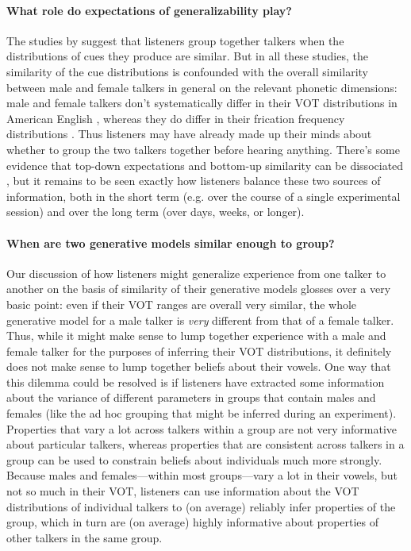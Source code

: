 \paragraph{What role do expectations of generalizability play?}
\label{sec:what-role-expect}

The studies by \textcite{Kraljic2005,Kraljic2006,Kraljic2007} suggest that listeners group together talkers when the distributions of cues they produce are similar.  But in all these studies, the similarity of the cue distributions is confounded with the overall similarity between male and female talkers in general on the relevant phonetic dimensions: male and female talkers don't systematically differ in their VOT distributions in American English \autocite{Allen2003}, whereas they do differ in their frication frequency distributions \autocite{Newman2001}.  Thus listeners may have already made up their minds about whether to group the two talkers together before hearing anything.  There's some evidence that top-down expectations and bottom-up similarity can be dissociated \autocite{Munson2011,Reinisch2014}, but it remains to be seen exactly how listeners balance these two sources of information, both in the short term (e.g. over the course of a single experimental session) and over the long term (over days, weeks, or longer).
\label{r1-reinisch2}

\paragraph{When are two generative models similar enough to group?}
\label{sec:open-questions}

Our discussion of how listeners might generalize experience from one talker to another on the basis of similarity of their generative models glosses over a very basic point: even if their VOT ranges are overall very similar, the whole generative model for a male talker is \emph{very} different from that of a female talker.  Thus, while it might make sense to lump together experience with a male and female talker for the purposes of inferring their VOT distributions, it definitely does not make sense to lump together beliefs about their vowels.  One way that this dilemma could be resolved is if listeners have extracted some information about the variance of different parameters in groups that contain males and females (like the ad hoc grouping that might be inferred during an experiment).  Properties that vary a lot across talkers within a group are not very informative about particular talkers, whereas properties that are consistent across talkers in a group can be used to constrain beliefs about individuals much more strongly.  Because males and females---within most groups---vary a lot in their vowels, but not so much in their VOT, listeners can use information about the VOT distributions of individual talkers to (on average) reliably infer properties of the group, which in turn are (on average) highly informative about properties of other talkers in the same group.

